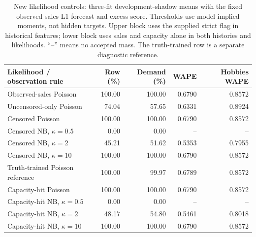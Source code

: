\begin{table}[t]
\centering\small
\caption{New likelihood controls: three-fit development-shadow means with the fixed observed-sales L1 forecast and excess score. Thresholds use model-implied moments, not hidden targets. Upper block uses the supplied strict flag in historical features; lower block uses sales and capacity alone in both histories and likelihoods. ``--'' means no accepted mass. The truth-trained row is a separate diagnostic reference.}
\label{tab:observable}
\begin{tabular}{lrrrr}
\toprule
Likelihood / observation rule & Row (\%) & Demand (\%) & WAPE & Hobbies WAPE\\
\midrule
Observed-sales Poisson & 100.00 & 100.00 & 0.6790 & 0.8572\\
Uncensored-only Poisson & 74.04 & 57.65 & 0.6331 & 0.8924\\
Censored Poisson & 100.00 & 100.00 & 0.6790 & 0.8572\\
Censored NB, $\kappa=0.5$ & 0.00 & 0.00 & -- & --\\
Censored NB, $\kappa=2$ & 45.21 & 51.62 & 0.5353 & 0.7955\\
Censored NB, $\kappa=10$ & 100.00 & 100.00 & 0.6790 & 0.8572\\
Truth-trained Poisson reference & 100.00 & 99.97 & 0.6789 & 0.8572\\
\midrule
Capacity-hit Poisson & 100.00 & 100.00 & 0.6790 & 0.8572\\
Capacity-hit NB, $\kappa=0.5$ & 0.00 & 0.00 & -- & --\\
Capacity-hit NB, $\kappa=2$ & 48.17 & 54.80 & 0.5461 & 0.8018\\
Capacity-hit NB, $\kappa=10$ & 100.00 & 100.00 & 0.6790 & 0.8572\\
\bottomrule\end{tabular}\end{table}
